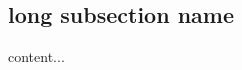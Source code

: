 \documentclass{beamer}
\begin{document}
\subsection[short subsection name]{long subsection name}
\begin{frame}
content...
\end{frame}
\end{document}
